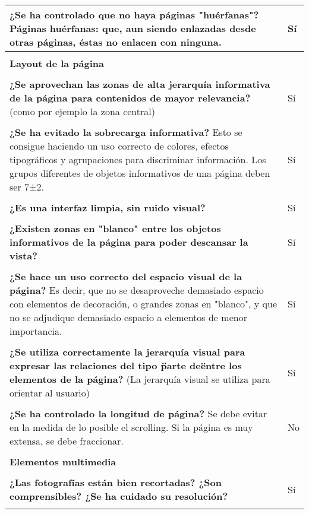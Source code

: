 \begin{longtable}[H]{p{31em}|p{5em}}
\textbf{¿Se ha controlado que no haya páginas "huérfanas"?} Páginas huérfanas: que, aun siendo enlazadas desde otras páginas, éstas no enlacen con ninguna.  & Sí \\ \hline \\[-1em]
\multicolumn{2}{p{36em}}{\cellcolor[rgb]{ .851,  .886,  .953} \textbf{Layout de la página}} \\ \hline \\[-1em]
\textbf{¿Se aprovechan las zonas de alta jerarquía informativa de la página para contenidos de mayor relevancia?} (como por ejemplo la zona central)  & Sí \\ \hline \\[-1em]
\textbf{¿Se ha evitado la sobrecarga informativa?} Esto se consigue haciendo un uso correcto de colores, efectos tipográficos y agrupaciones para discriminar información. Los grupos diferentes de objetos informativos de una página deben ser 7±2.  & Sí \\ \hline \\[-1em]
\textbf{¿Es una interfaz limpia, sin ruido visual?} & Sí \\ \hline \\[-1em]
\textbf{¿Existen zonas en "blanco" entre los objetos informativos de la página para poder descansar la vista?} & Sí \\ \hline \\[-1em]
\textbf{¿Se hace un uso correcto del espacio visual de la página?} Es decir, que no se desaproveche demasiado espacio con elementos de decoración, o grandes zonas en "blanco", y que no se adjudique demasiado espacio a elementos de menor importancia.  & Sí \\ \hline \\[-1em]
\textbf{¿Se utiliza correctamente la jerarquía visual para expresar las relaciones del tipo \"parte de\" entre los elementos de la página?} (La jerarquía visual se utiliza para orientar al usuario) & Sí \\ \hline \\[-1em]
\textbf{¿Se ha controlado la longitud de página?} Se debe evitar en la medida de lo posible el scrolling. Si la página es muy extensa, se debe fraccionar.  & No \\ \hline \\[-1em]
\multicolumn{2}{p{36em}}{\cellcolor[rgb]{ .851,  .886,  .953} \textbf{Elementos multimedia}} \\ \hline \\[-1em]
\textbf{¿Las fotografías están bien recortadas? ¿Son comprensibles? ¿Se ha cuidado su resolución? } & Sí \\ \hline \\[-1em]

\end{longtable}
